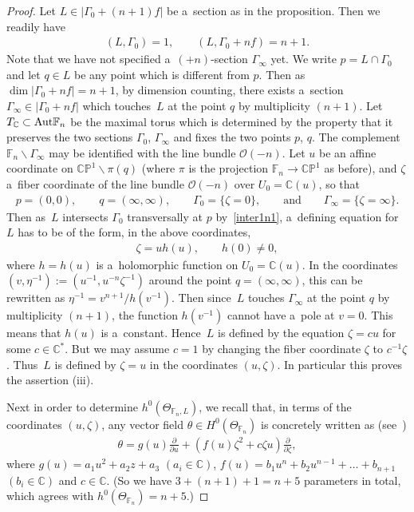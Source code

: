 \begin{proof}
Let $L\in |\Gamma_0 +(n+1)f|$ be a~section as in the proposition.
Then we readily have
\begin{gather}
\label{inter1n1}
(L,\Gamma_0)=1,
\qquad
(L,\Gamma_0+nf) = n+1.
\end{gather}
Note that we have not specif\/ied a~$(+n)$-section $\Gamma_{\infty}$ yet.
We write $p=L\cap\Gamma_0$ and let $q\in L$ be any point which is dif\/ferent from $p$.
Then as $\dim |\Gamma_0+nf| = n+1$, by dimension counting, there exists a~section $\Gamma_{\infty} \in |\Gamma_0 + nf|$
which touches~$L$ at the point $q$ by multiplicity $(n+1)$.
Let $T_{\mathbb{C}}\subset{\rm{Aut}}\mathbb{F}_n$ be the maximal torus which is determined by the property that it
preserves the two sections $\Gamma_0$, $\Gamma_{\infty}$ and f\/ixes the two points $p$, $q$.
The complement $\mathbb{F}_n\backslash \Gamma_{\infty}$ may be identif\/ied with the line bundle $\mathscr O(-n)$.
Let $u$ be an af\/f\/ine coordinate on $\mathbb{CP}^1\backslash \pi(q)$ (where $\pi$ is the projection
$\mathbb{F}_n\to\mathbb{CP}^1$ as before), and $\zeta$ a~f\/iber coordinate of the line bundle $\mathscr O(-n)$ over
$U_0=\mathbb{C}(u)$, so that
\begin{gather*}
p=(0,0),
\qquad
q=(\infty,\infty),
\qquad
\Gamma_{0} = \{\zeta=0\},
\qquad
\text{and}
\qquad
\Gamma_{\infty} = \{\zeta=\infty\}.
\end{gather*}
Then as~$L$ intersects $\Gamma_0$ transversally at $p$ by~\eqref{inter1n1}, a~def\/ining equation for~$L$ has to be of
the form, in the above coordinates,
\begin{gather*}
\zeta = uh(u),
\qquad
h(0)\neq 0,
\end{gather*}
where $h=h(u)$ is a~holomorphic function on $U_0 = \mathbb{C}(u)$.
In the coordinates $(v,\eta^{-1}):= (u^{-1},u^{-n}\zeta^{-1})$ around the point $q=(\infty,\infty)$, this can be
rewritten as $ \eta^{-1} = v^{n+1}/h(v^{-1})$.
Then since~$L$ touches $\Gamma_{\infty}$ at the point $q$ by multiplicity $(n+1)$, the function $h(v^{-1})$ cannot have
a~pole at $v=0$.
This means that $h(u)$ is a~constant.
Hence~$L$ is def\/ined by the equation $\zeta = cu$ for some $c\in \mathbb{C}^*$.
But we may assume $c=1$ by changing the f\/iber coordinate $\zeta$ to $c^{-1}\zeta$.
Thus~$L$ is def\/ined by $\zeta=u$ in the coordinates $(u,\zeta)$.
In particular this proves the assertion (iii).

Next in order to determine $h^0(\Theta_{\mathbb{F}_n,L})$, we recall that, in terms of the coordinates $(u,\zeta)$, any
vector f\/ield $\theta\in H^0(\Theta_{\mathbb{F}_n})$ is concretely written as (see~\cite[pp. 43--44]{MKbook})
\begin{gather}
\label{MK1}
\theta= g(u) \frac{\partial}{\partial u} + \left( f(u) \zeta^ 2 + c\zeta u \right) \frac{\partial}{\partial \zeta},
\end{gather}
where $g(u) = a_1 u^2 + a_2 z + a_3$
$(a_i\in\mathbb{C})$,
$f(u) = b_1 u^n + b_2 u^{n-1} + \dots + b_{n+1}$
$(b_i\in\mathbb{C})$ and $c\in \mathbb{C}$.
(So we have $3 + (n+1) + 1 = n + 5$ parameters in total, which agrees with $h^0(\Theta_{\mathbb{F}_n}) = n+5$.)


\end{proof}
